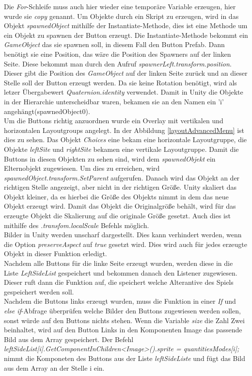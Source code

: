 Die \textit{For}-Schleife muss auch hier wieder eine temporäre Variable erzeugen, hier wurde sie \textit{copy} genannt. Um Objekte durch ein Skript zu erzeugen, wird in das Objekt \textit{spawnedObject} mithilfe der Instantiate-Methode, dies ist eine Methode um ein Objekt zu spawnen der Button erzeugt. Die Instantiate-Methode bekommt ein \textit{GameObject} das sie spawnen soll, in diesem Fall den Button Prefab. Dann benötigt sie eine Position, das wäre die Position des Spawners auf der linken Seite. Diese bekommt man durch den Aufruf \textit{spawnerLeft.transform.position}. Dieser gibt die Position des \textit{GameObject} auf der linken Seite zurück und an dieser Stelle soll der Button erzeugt werden. Da sie keine Rotation benötigt, wird als letzer Übergabewert \textit{Quaternion.identity} verwendet.
Damit in Unity die Objekte in der Hierarchie unterscheidbar waren, bekamen sie an den Namen ein 'i' angehängt(spawnedObject0).\\
Um die Buttons richtig anzuordnen wurde ein Overlay mit vertikalen und horizontalen Layoutgroups angelegt. In der Abbildung \ref{layoutAdvancedMenu} ist dies zu sehen. Das Objekt \textit{Choices}  eine bekam eine horizontale Layoutgruppe, die Objekte \textit{leftSite} und \textit{rightSite} bekamen eine vertikale Layoutgruppe. 
Damit die Buttons in diesen Objekten zu sehen sind, wird dem \textit{spawnedObjekt} ein Elternobjekt zugewiesen. Um dies zu erreichen, wird \textit{spawnedObject.transform.SetParent} aufgerufen. Danach wird das Objekt an der richtigen Stelle angezeigt, aber nicht in der richtigen Größe. Unity skaliert das Objekt kleiner, da es hierbei die Größe des Objekts nimmt in dem das neue Objekt erzeugt wird. Damit das Objekt die Originalgröße behält, wird für das erzeugte Objekt die Skalierung auf die originale Größe gesetzt. Auch dies ist mithilfe des \textit{.transfom.localScale} Befehls möglich.\\
Bilder in Unity werden unscharf dargestellt. Dies kann verhindert werden, wenn die Option \textit{preserveAspect} auf \textit{true} gesetzt wird. Dies wird auch für jedes erzeugte Objekt in dieser Funktion erledigt.\\
Nachdem alle Buttons für die linke Seite erzeugt wurden, werden diese in die Liste \textit{LeftSideList} gespeichert und bekommen danach den Listener zugewiesen. Dieser ruft dann die Funktion auf, die speichert welche Alterantive des Spiels gespeichert werden soll.\\
Nachdem die Buttons links erzeugt wurden, muss die Funktion in einer \textit{If} und \textit{else if}-Abfrage überprüfen welche Bilder den Buttons zugewiesen werden sollen, sonst würde auf den Buttons nichts stehen. Wenn die Variable \textit{size} die Zahl Zwei beinhaltet, wird auf den Button Links in den Komponenten Image das passende Bild aus dem Array gespeichert. Der Befehl \textit{leftSideList[i].GetComponentInChildren<Image>().sprite = quantitiesModes[i];} nimmt die Komponeten des Buttons aus der Liste \textit{leftSideListe} und fügt das Bild aus dem Array an der Stelle i ein.\\
